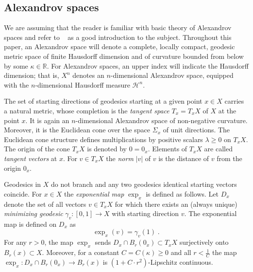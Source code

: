 \documentclass[12pt,leqno,intlimits]{amsart}
\numberwithin{equation}{section}
\theoremstyle{definition}
\theoremstyle{remark}
\newcommand{\vol}{\mathrm{vol}}
\newcommand{\R}{\mathbb{R}}
\def\:{\colon}
\begin{document}
\subsection{Alexandrov spaces} \label{subsec:Alex}
We are assuming that the reader is familiar with basic theory of Alexandrov spaces and  refer to ~\cite{BGP} as a good introduction to the subject.
Throughout this paper, an Alexandrov space will denote a complete, locally compact, geodesic metric space of finite Hausdorff dimension and of curvature bounded from below by some $\kappa \in \R$.
 For Alexandrov spaces, an upper index will indicate the Hausdorff dimension; that is, $X^n$ denotes an $n$-dimensional Alexandrov space, equipped with the $n$-dimensional Hausdorff measure $\mathcal H^n$.

The set of starting directions of geodesics starting at a given point $x\in X$ carries a natural metric, whose completion is the \emph{tangent space} $T_x=T_xX$
of $X$ at the point $x$.  It is again an $n$-dimensional Alexandrov space of non-negative curvature. Moreover, it is the Euclidean cone
over the space $\Sigma _x$ of unit directions. The Euclidean cone structure defines multiplications by positive scalars $\lambda \geq 0$ on $T_xX$. The origin
of the cone $T_xX$ is denoted by $0=0_x$. Elements of $T_xX$ are called \emph{tangent vectors} at $x$. For $v\in T_xX$ the \emph{norm} $|v|$ of $v$ is the distance of $v$ from the origin $0_x$.


 Geodesics in $X$ do not branch and any two geodesics identical  starting vectors coincide.
For  $x\in X$ the \emph{exponential map}  $\exp_x $ is defined as follows.  Let $D_x$ denote the set of all vectors $v\in T_xX$
 for which there exists an (always unique)  \emph{minimizing geodesic}  $\gamma_v\:[0,1] \to X$ with starting direction $v$.  The exponential map is defined on $D_x$ as
 $$\exp _x (v)= \gamma _v(1) \;.$$
 For  any $r>0$, the map $\exp_x$ sends  $D_x\cap B_r (0_x)\subset T_xX$ surjectively onto $B_r(x)\subset X$.
 Moreover, for a constant $C=C(\kappa)\geq 0$  and all $r< \frac 1 C$ the map $\exp_x \:D_x \cap B_r(0_x) \to B_r(x)$ is  $(1+ C \cdot  r^2)$-Lipschitz continuous.
\end{document}
